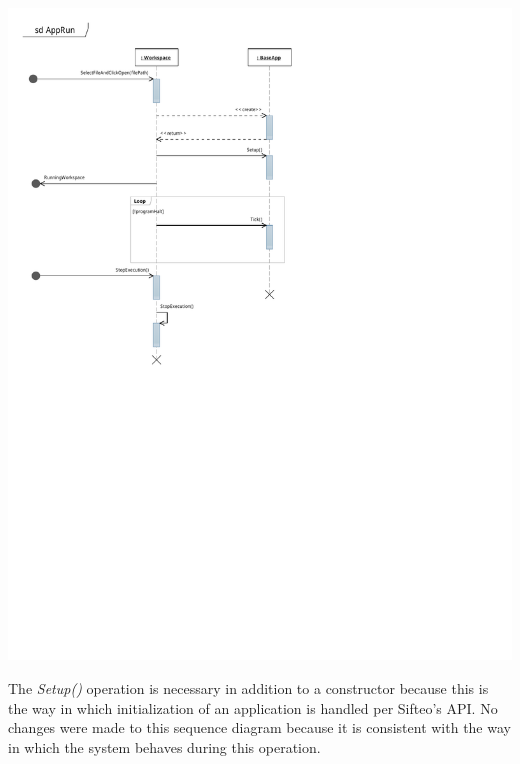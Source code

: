 \documentclass[12pt]{article}
\begin{document}
\begin{center}
        \includegraphics[scale=1]{./pdfs/MS4Models/ReflexGame.pdf}
\end{center}
The \textit{Setup()} operation is necessary in addition to a constructor because this is the way in which initialization of an application is handled per Sifteo's API. No changes were made to this sequence diagram because it is consistent with the way in which the system behaves during this operation.
\end{document}
